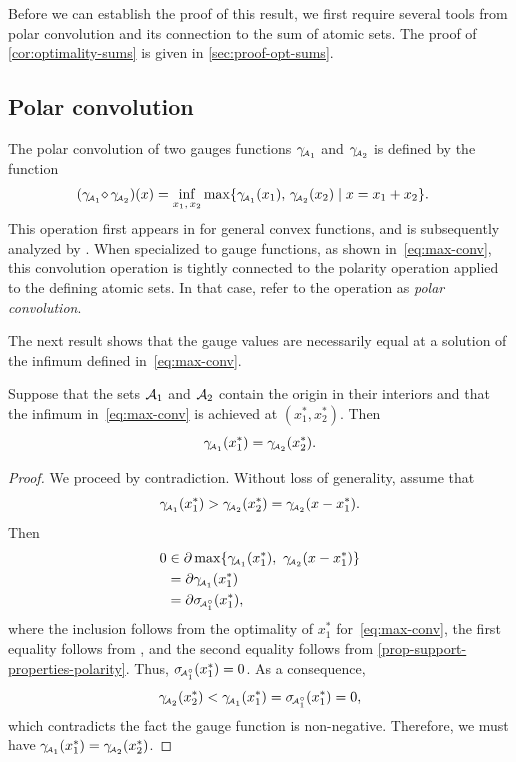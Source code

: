Before we can establish the proof of this result, we first require several tools
from polar convolution and its connection to the sum of atomic sets. The proof
of \autoref{cor:optimality-sums} is given in \autoref{sec:proof-opt-sums}.


\subsection{Polar convolution}

The polar convolution of two gauges functions $\gamma_{\!\scriptscriptstyle\mathcal{A}_1}$ and $\gamma_{\!\scriptscriptstyle\mathcal{A}_2}$
is defined by the function
\begin{align}
  (\gamma_{\!\scriptscriptstyle\mathcal{A}_1}\!\mathop{\diamond}\gamma_{\!\scriptscriptstyle\mathcal{A}_2})(x)
  &= \inf_{x_1,\,x_2}\max\{\gamma_{\!\scriptscriptstyle\mathcal{A}_1}(x_1),\,\gamma_{\!\scriptscriptstyle\mathcal{A}_2}(x_2) \mid x=x_1+x_2\}.
    \label{eq:max-conv}
\end{align}
This operation first appears in \citet[Theorem~5.8]{rockafellar1970convex} for
general convex functions, and is subsequently analyzed by \citet{SeegerVolle95}.
When specialized to gauge functions, as shown in~\eqref{eq:max-conv}, this
convolution operation is tightly connected to the polarity operation applied to
the defining atomic sets. In that case, \citet{friedlander2019polarconvolution} refer
to the operation as \emph{polar convolution}.

The next result shows that the gauge values are necessarily equal at a solution
of the infimum defined in~\eqref{eq:max-conv}. 
\begin{lemma}
  \label{prop:balance-polar-convolution}
   Suppose that the sets $\mathcal{A}_1$ and $\mathcal{A}_2$ contain the origin in their
  interiors and that the infimum in~\eqref{eq:max-conv} is achieved at
  $(x_1^*, x_2^*)$. Then
  \[\gamma_{\!\scriptscriptstyle\mathcal{A}_1}(x_1^*) = \gamma_{\!\scriptscriptstyle\mathcal{A}_2}(x_2^*).\]
\end{lemma}

\begin{proof}
  We proceed by contradiction. Without loss of generality, assume that
  \[
    \gamma_{\!\scriptscriptstyle\mathcal{A}_1}(x_1^*) > \gamma_{\!\scriptscriptstyle\mathcal{A}_2}(x_2^*) = \gamma_{\!\scriptscriptstyle\mathcal{A}_2}(x - x_1^*).
  \]
  Then 
  \begin{align*}
    0 &\in \partial\max\{\gamma_{\!\scriptscriptstyle\mathcal{A}_1}(x_1^*),\ \gamma_{\!\scriptscriptstyle\mathcal{A}_2}(x-x_1^*)\}
    \\&= \partial\gamma_{\!\scriptscriptstyle\mathcal{A}_1}(x_1^*)
    \\&=  \partial\sigma_{\!\scriptscriptstyle\mathcal{A}_1^\circ}(x_1^*),
  \end{align*}
  where the inclusion follows from the optimality of $x_1^*$
  for~\eqref{eq:max-conv}, the first equality follows from
  \citet[Theorem~D.4.4.2]{hiriart-urruty01}, and the second equality follows
  from \autoref{prop-support-properties-polarity}. Thus, $\sigma_{\!\scriptscriptstyle\mathcal{A}_1^\circ}(x_1^*)=0$.
  As a consequence, 
  \[
    \gamma_{\!\scriptscriptstyle\mathcal{A}_2}(x_2^*) < \gamma_{\!\scriptscriptstyle\mathcal{A}_1}(x_1^*) = \sigma_{\!\scriptscriptstyle\mathcal{A}_1^\circ}(x_1^*) = 0,
  \]
  which contradicts the fact the gauge function is non-negative. Therefore, we
  must have 
  $\gamma_{\!\scriptscriptstyle\mathcal{A}_1}(x_1^*) = \gamma_{\!\scriptscriptstyle\mathcal{A}_2}(x_2^*)$.
\end{proof}

